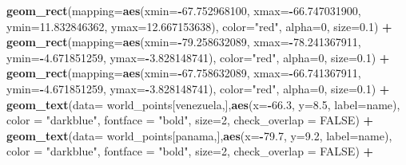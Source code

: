 \documentclass[12pt,twoside]{reedthesis}
\newenvironment{Shaded}{\begin{snugshade}}{\end{snugshade}}
\newcommand{\DataTypeTok}[1]{\textcolor[rgb]{0.13,0.29,0.53}{#1}}
\newcommand{\DecValTok}[1]{\textcolor[rgb]{0.00,0.00,0.81}{#1}}
\newcommand{\FloatTok}[1]{\textcolor[rgb]{0.00,0.00,0.81}{#1}}
\newcommand{\KeywordTok}[1]{\textcolor[rgb]{0.13,0.29,0.53}{\textbf{#1}}}
\newcommand{\NormalTok}[1]{#1}
\newcommand{\OperatorTok}[1]{\textcolor[rgb]{0.81,0.36,0.00}{\textbf{#1}}}
\newcommand{\OtherTok}[1]{\textcolor[rgb]{0.56,0.35,0.01}{#1}}
\newcommand{\StringTok}[1]{\textcolor[rgb]{0.31,0.60,0.02}{#1}}
\begin{document}
\begin{Shaded}
\begin{Highlighting}[]
\StringTok{  }\KeywordTok{geom_rect}\NormalTok{(}\DataTypeTok{mapping=}\KeywordTok{aes}\NormalTok{(}\DataTypeTok{xmin=}\OperatorTok{-}\FloatTok{67.752968100}\NormalTok{, }\DataTypeTok{xmax=}\OperatorTok{-}\FloatTok{66.747031900}\NormalTok{, }\DataTypeTok{ymin=}\FloatTok{11.832846362}\NormalTok{, }\DataTypeTok{ymax=}\FloatTok{12.667153638}\NormalTok{), }\DataTypeTok{color=}\StringTok{"red"}\NormalTok{, }\DataTypeTok{alpha=}\DecValTok{0}\NormalTok{, }\DataTypeTok{size=}\FloatTok{0.1}\NormalTok{) }\OperatorTok{+}
\StringTok{  }\KeywordTok{geom_rect}\NormalTok{(}\DataTypeTok{mapping=}\KeywordTok{aes}\NormalTok{(}\DataTypeTok{xmin=}\OperatorTok{-}\FloatTok{79.258632089}\NormalTok{, }\DataTypeTok{xmax=}\OperatorTok{-}\FloatTok{78.241367911}\NormalTok{, }\DataTypeTok{ymin=}\OperatorTok{-}\FloatTok{4.671851259}\NormalTok{, }\DataTypeTok{ymax=}\OperatorTok{-}\FloatTok{3.828148741}\NormalTok{), }\DataTypeTok{color=}\StringTok{"red"}\NormalTok{, }\DataTypeTok{alpha=}\DecValTok{0}\NormalTok{, }\DataTypeTok{size=}\FloatTok{0.1}\NormalTok{) }\OperatorTok{+}
\StringTok{  }\KeywordTok{geom_rect}\NormalTok{(}\DataTypeTok{mapping=}\KeywordTok{aes}\NormalTok{(}\DataTypeTok{xmin=}\OperatorTok{-}\FloatTok{67.758632089}\NormalTok{, }\DataTypeTok{xmax=}\OperatorTok{-}\FloatTok{66.741367911}\NormalTok{, }\DataTypeTok{ymin=}\OperatorTok{-}\FloatTok{4.671851259}\NormalTok{, }\DataTypeTok{ymax=}\OperatorTok{-}\FloatTok{3.828148741}\NormalTok{), }\DataTypeTok{color=}\StringTok{"red"}\NormalTok{, }\DataTypeTok{alpha=}\DecValTok{0}\NormalTok{, }\DataTypeTok{size=}\FloatTok{0.1}\NormalTok{) }\OperatorTok{+}
\StringTok{  }\KeywordTok{geom_text}\NormalTok{(}\DataTypeTok{data=}\NormalTok{ world_points[venezuela,],}\KeywordTok{aes}\NormalTok{(}\DataTypeTok{x=}\OperatorTok{-}\FloatTok{66.3}\NormalTok{, }\DataTypeTok{y=}\FloatTok{8.5}\NormalTok{, }\DataTypeTok{label=}\NormalTok{name), }\DataTypeTok{color =} \StringTok{"darkblue"}\NormalTok{, }\DataTypeTok{fontface =} \StringTok{"bold"}\NormalTok{, }\DataTypeTok{size=}\DecValTok{2}\NormalTok{, }\DataTypeTok{check_overlap =} \OtherTok{FALSE}\NormalTok{) }\OperatorTok{+}
\StringTok{  }\KeywordTok{geom_text}\NormalTok{(}\DataTypeTok{data=}\NormalTok{ world_points[panama,],}\KeywordTok{aes}\NormalTok{(}\DataTypeTok{x=}\OperatorTok{-}\FloatTok{79.7}\NormalTok{, }\DataTypeTok{y=}\FloatTok{9.2}\NormalTok{, }\DataTypeTok{label=}\NormalTok{name), }\DataTypeTok{color =} \StringTok{"darkblue"}\NormalTok{, }\DataTypeTok{fontface =} \StringTok{"bold"}\NormalTok{, }\DataTypeTok{size=}\DecValTok{2}\NormalTok{, }\DataTypeTok{check_overlap =} \OtherTok{FALSE}\NormalTok{) }\OperatorTok{+}\StringTok{ }

\end{Highlighting}
\end{Shaded}
\end{document}
